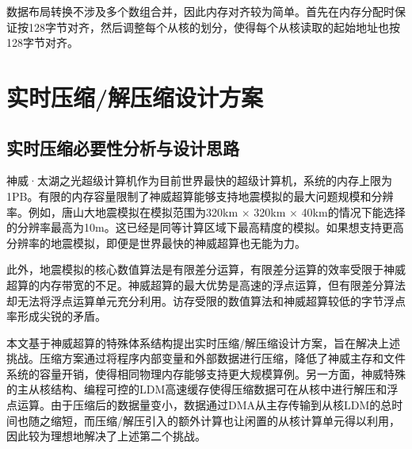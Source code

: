 数据布局转换不涉及多个数组合并，因此内存对齐较为简单。首先在内存分配时保证按128字节对齐，然后调整每个从核的划分，使得每个从核读取的起始地址也按128字节对齐。




\section{实时压缩/解压缩设计方案}
\label{sec:实时压缩/解压缩设计方案}
\subsection{实时压缩必要性分析与设计思路}

神威·太湖之光超级计算机作为目前世界最快的超级计算机，系统的内存上限为1PB。有限的内存容量限制了神威超算能够支持地震模拟的最大问题规模和分辨率。例如，唐山大地震模拟在模拟范围为320km $\times$ 320km $\times$ 40km的情况下能选择的分辨率最高为10m。这已经是同等计算区域下最高精度的模拟。如果想支持更高分辨率的地震模拟，即便是世界最快的神威超算也无能为力。

此外，地震模拟的核心数值算法是有限差分运算，有限差分运算的效率受限于神威超算的内存带宽的不足。神威超算的最大优势是高速的浮点运算，但有限差分算法却无法将浮点运算单元充分利用。访存受限的数值算法和神威超算较低的字节浮点率形成尖锐的矛盾。

本文基于神威超算的特殊体系结构提出实时压缩/解压缩设计方案，旨在解决上述挑战。压缩方案通过将程序内部变量和外部数据进行压缩，降低了神威主存和文件系统的容量开销，使得相同物理内存能够支持更大规模算例。另一方面，神威特殊的主从核结构、编程可控的LDM高速缓存使得压缩数据可在从核中进行解压和浮点运算。由于压缩后的数据量变小，数据通过DMA从主存传输到从核LDM的总时间也随之缩短，而压缩/解压引入的额外计算也让闲置的从核计算单元得以利用，因此较为理想地解决了上述第二个挑战。

